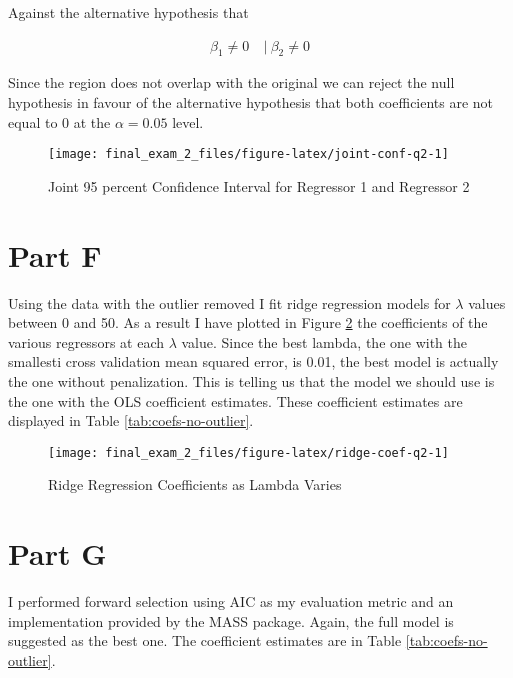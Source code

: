 \documentclass[]{book}
\begin{document}
Against the alternative hypothesis that

\begin{align}
  \beta_1 \neq 0\ &|\ \beta_2 \neq 0
\end{align}

Since the region does not overlap with the original we can reject the null hypothesis in favour of the alternative hypothesis that both coefficients are not equal to 0 at the \(\alpha = 0.05\) level.

\begin{figure}

{\centering \texttt{[image: final\_exam\_2\_files/figure-latex/joint-conf-q2-1]} 

}

\caption{Joint 95 percent Confidence Interval for Regressor 1 and Regressor 2}\label{fig:joint-conf-q2}
\end{figure}

\hypertarget{part-f}{%
\section{Part F}\label{part-f}}

Using the data with the outlier removed I fit ridge regression models for \(\lambda\) values between 0 and 50. As a result I have plotted in Figure \ref{fig:ridge-coef-q2} the coefficients of the various regressors at each \(\lambda\) value. Since the best lambda, the one with the smallesti cross validation mean squared error, is 0.01, the best model is actually the one without penalization. This is telling us that the model we should use is the one with the OLS coefficient estimates. These coefficient estimates are displayed in Table \ref{tab:coefs-no-outlier}.

\begin{figure}

{\centering \texttt{[image: final\_exam\_2\_files/figure-latex/ridge-coef-q2-1]} 

}

\caption{Ridge Regression Coefficients as Lambda Varies}\label{fig:ridge-coef-q2}
\end{figure}

\hypertarget{part-g}{%
\section{Part G}\label{part-g}}

I performed forward selection using AIC as my evaluation metric and an implementation provided by the MASS package. Again, the full model is suggested as the best one. The coefficient estimates are in Table \ref{tab:coefs-no-outlier}.
\end{document}
